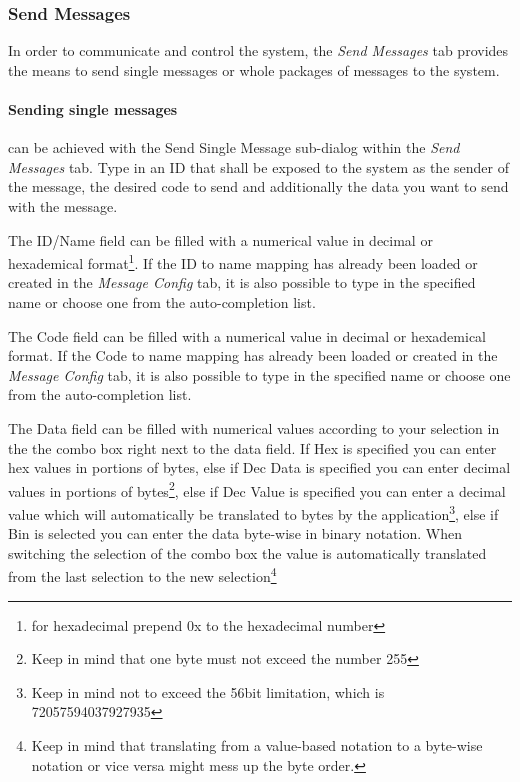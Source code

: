 \documentclass[12pt,a4paper]{scrartcl}
\begin{document}
\subsubsection{Send Messages}
\label{subsubsec:GettingStartedOverviewSendMsgs}
In order to communicate and control the system, the \textit{Send Messages} tab provides the means to send single messages or whole packages of messages to the system.

\paragraph{Sending single messages} can be achieved with the Send Single Message sub-dialog within the \textit{Send Messages} tab. Type in an ID that shall be exposed to the system as the sender of the message, the desired code to send and additionally the data you want to send with the message. 

The ID/Name field can be filled with a numerical value in decimal or hexademical format\footnote{for hexadecimal prepend 0x to the hexadecimal number}. If the ID to name mapping has already been loaded or created in the \textit{Message Config} tab, it is also possible to type in the specified name or choose one from the auto-completion list.

The Code field can be filled with a numerical value in decimal or hexademical format. If the Code to name mapping has already been loaded or created in the \textit{Message Config} tab, it is also possible to type in the specified name or choose one from the auto-completion list. 

The Data field can be filled with numerical values according to your selection in the the combo box right next to the data field. If Hex is specified you can enter hex values in portions of bytes, else if Dec Data is specified you can enter decimal values in portions of bytes\footnote{Keep in mind that one byte must not exceed the number 255}, else if Dec Value is specified you can enter a decimal value which will automatically be translated to bytes by the application\footnote{Keep in mind not to exceed the 56bit limitation, which is 72057594037927935}, else if Bin is selected you can enter the data byte-wise in binary notation. When switching the selection of the combo box the value is automatically translated from the last selection to the new selection\footnote{Keep in mind that translating from a value-based notation to a byte-wise notation or vice versa might mess up the byte order.}
\end{document}
